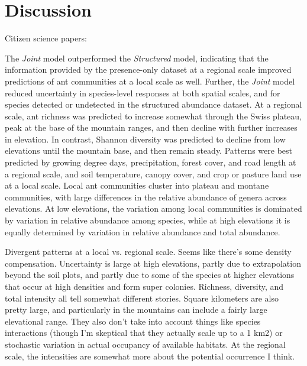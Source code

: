 \documentclass[preprint,review,times,12pt]{elsarticle}
\begin{document}
 




\section{Discussion}
\label{S:4}
Citizen science papers: \citep{Altwegg2019, Pernat2020, Henckel2020, Duan2020, Johnston2020,Robinson2019, Beck2010, Poisson2020}

The \emph{Joint} model outperformed the \emph{Structured} model, indicating that the information provided by the presence-only dataset at a regional scale improved predictions of ant communities at a local scale as well. Further, the \emph{Joint} model reduced uncertainty in species-level responses at both spatial scales, and for species detected or undetected in the structured abundance dataset. At a regional scale, ant richness was predicted to increase somewhat through the Swiss plateau, peak at the base of the mountain ranges, and then decline with further increases in elevation. In contrast, Shannon diversity was predicted to decline from low elevations until the mountain base, and then remain steady. Patterns were best predicted by growing degree days, precipitation, forest cover, and road length at a regional scale, and soil temperature, canopy cover, and crop or pasture land use at a local scale. Local ant communities cluster into plateau and montane communities, with large differences in the relative abundance of genera across elevations. At low elevations, the variation among local communities is dominated by variation in relative abundance among species, while at high elevations it is equally determined by variation in relative abundance and total abundance.

Divergent patterns at a local vs. regional scale. Seems like there's some density compensation. Uncertainty is large at high elevations, partly due to extrapolation beyond the soil plots, and partly due to some of the species at higher elevations that occur at high densities and form super colonies. Richness, diversity, and total intensity all tell somewhat different stories. Square kilometers are also pretty large, and particularly in the mountains can include a fairly large elevational range. They also don't take into account things like species interactions (though I'm skeptical that they actually scale up to a 1 km2) or stochastic variation in actual occupancy of available habitats. At the regional scale, the intensities are somewhat more about the potential occurrence I think.
\end{document}
